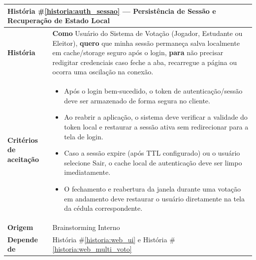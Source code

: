\documentclass[12pt,a4paper]{article}
\newcounter{historia}
\begin{document}
\label{historia:auth_sessao}
\begin{table}[H]
    \centering
    \begin{tabular}{|m{4.5cm} | m{11cm}|}
    \hline
    
    \multicolumn{2}{|l|}{\textbf{História \#\ref{historia:auth_sessao} --- Persistência de Sessão e Recuperação de Estado Local}} \\
    
    \hline  \textbf{História} &
    \textbf{Como} Usuário do Sistema de Votação (Jogador, Estudante ou Eleitor), \newline
    \textbf{quero} que minha sessão permaneça salva localmente em cache/storage seguro após o login, \newline  
    \textbf{para} não precisar redigitar credenciais caso feche a aba, recarregue a página ou ocorra uma oscilação na conexão. \\
    
    \textbf{Critérios de aceitação} &
    \begin{itemize}
        \item{Após o login bem-sucedido, o token de autenticação/sessão deve ser armazenado de forma segura no cliente.}
        \item{Ao reabrir a aplicação, o sistema deve verificar a validade do token local e restaurar a sessão ativa sem redirecionar para a tela de login.}
        \item{Caso a sessão expire (após TTL configurado) ou o usuário selecione Sair, o cache local de autenticação deve ser limpo imediatamente.}
        \item{O fechamento e reabertura da janela durante uma votação em andamento deve restaurar o usuário diretamente na tela da cédula correspondente.}
    \end{itemize}\\
    
    \textbf{Origem} &
    Brainstorming Interno \\
    
    \textbf{Depende de} &
    História \#\ref{historia:web_ui} e História \#\ref{historia:web_multi_voto}\\
    
    \hline
    \end{tabular}
\end{table}

\vspace{0.5cm}
\end{document}

